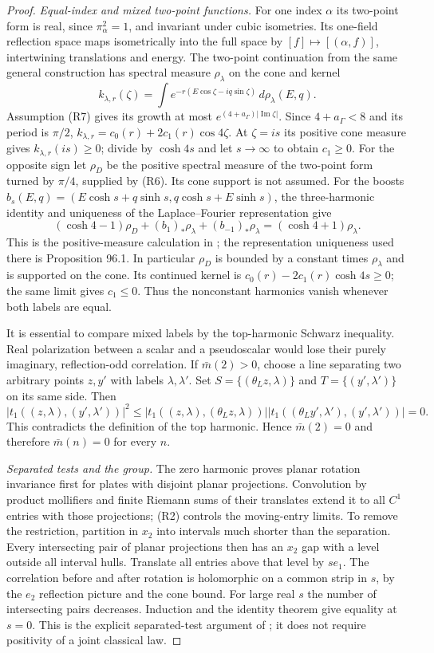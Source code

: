 \documentclass[11pt,letterpaper,reqno]{amsart}
\theoremstyle{definition}
\theoremstyle{remark}
\begin{document}
\begin{proof}
\emph{Equal-index and mixed two-point functions.}
For one index $\alpha$ its two-point form is real,
since $\pi_\alpha^2=1$, and invariant under cubic
isometries.  Its one-field reflection space maps
isometrically into the full space by
$[f]\mapsto[(\alpha,f)]$, intertwining translations
and energy.  The two-point continuation from the
same general construction has spectral measure
$\rho_\lambda$ on the cone and kernel
\[
 k_{\lambda,r}(\zeta)=\int
 e^{-r(E\cos\zeta-iq\sin\zeta)}\,d\rho_\lambda(E,q).
\]
Assumption (R7) gives its growth at most
$e^{(4+a_\Gamma)|\operatorname{Im}\zeta|}$.
Since $4+a_\Gamma<8$ and its period is $\pi/2$,
$k_{\lambda,r}=c_0(r)+2c_1(r)\cos4\zeta$.
At $\zeta=is$ its positive cone measure gives
$k_{\lambda,r}(is)\ge0$; divide by $\cosh4s$ and
let $s\to\infty$ to obtain $c_1\ge0$.
For the opposite sign let $\rho_D$ be the positive
spectral measure of the two-point form turned by
$\pi/4$, supplied by (R6).  Its cone support is
not assumed.  For the boosts
$b_s(E,q)=(E\cosh s+q\sinh s,q\cosh s+E\sinh s)$,
the three-harmonic identity and uniqueness of the
Laplace--Fourier representation give
\[
 (\cosh4-1)\rho_D+(b_1)_*\rho_\lambda+
       (b_{-1})_*\rho_\lambda
                       =(\cosh4+1)\rho_\lambda.
\]
This is the positive-measure calculation in
\cite[Proposition 96.4]{YMM1}; the representation
uniqueness used there is Proposition 96.1.
In particular $\rho_D$ is bounded by a constant
times $\rho_\lambda$ and is supported on the cone.
Its continued kernel is
$c_0(r)-2c_1(r)\cosh4s\ge0$; the same limit gives
$c_1\le0$.  Thus the nonconstant
harmonics vanish whenever both labels are equal.

It is essential to compare mixed labels by the
top-harmonic Schwarz inequality.  Real polarization
between a scalar and a pseudoscalar would lose their
purely imaginary, reflection-odd correlation.
If $\bar m(2)>0$, choose a line separating two
arbitrary points $z,y'$ with labels $\lambda,\lambda'$.
Set $S=\{(\theta_Lz,\lambda)\}$ and
$T=\{(y',\lambda')\}$ on its same side.  Then
\[
 |t_1((z,\lambda),(y',\lambda'))|^2
 \le|t_1((z,\lambda),(\theta_Lz,\lambda))|
       |t_1((\theta_Ly',\lambda'),(y',\lambda'))|=0.
\]
This contradicts the definition of the top harmonic.
Hence $\bar m(2)=0$ and therefore $\bar m(n)=0$
for every $n$.

\emph{Separated tests and the group.}
The zero harmonic proves planar rotation invariance
first for plates with disjoint planar projections.
Convolution by product mollifiers and finite Riemann
sums of their translates extend it to all $C^1$
entries with those projections; (R2) controls the
moving-entry limits.  To remove the restriction,
partition in $x_2$ into intervals much shorter than
the separation.  Every intersecting pair of planar
projections then has an $x_2$ gap with a level outside
all interval hulls.  Translate all entries above
that level by $se_1$.  The correlation before and
after rotation is holomorphic on a common strip in
$s$, by the $e_2$ reflection picture and the cone
bound.  For large real $s$ the number of intersecting
pairs decreases.  Induction and the identity theorem
give equality at $s=0$.  This is the explicit
separated-test argument of
\cite[Proposition 95.4]{YMM1}; it does not require
positivity of a joint classical law.


\end{proof}
\end{document}
